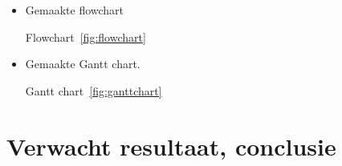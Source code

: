 \begin{itemize}
 \item Gemaakte flowchart

Flowchart~\ref{fig:flowchart}

 \item Gemaakte Gantt chart.

Gantt chart~\ref{fig:ganttchart}
\end{itemize}








\section{Verwacht resultaat, conclusie}%
\label{sec:verwachte_resultaten}

